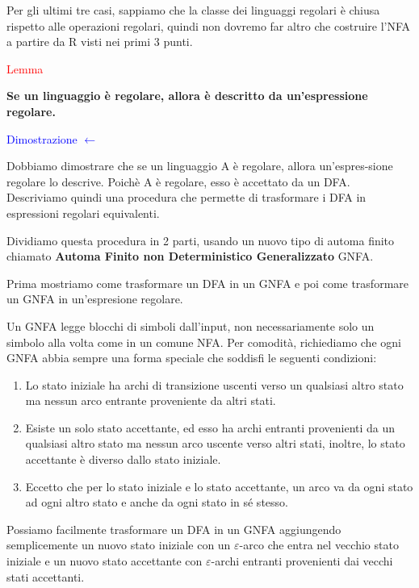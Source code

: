 \documentclass{article}
\begin{document}
    Per gli ultimi tre casi, sappiamo che la classe dei linguaggi regolari è chiusa rispetto alle operazioni regolari, quindi non dovremo far altro che costruire l'NFA a partire da R visti nei primi 3 punti.

\begin{center}
    \textcolor{red}{Lemma}

    \textbf{Se un linguaggio è regolare, allora è descritto da un'espressione regolare.}
\end{center}

\textcolor{blue}{Dimostrazione $\leftarrow$}

Dobbiamo dimostrare che se un linguaggio A è regolare, allora un'espres-sione regolare lo descrive. Poichè A è regolare, esso è accettato da un DFA. Descriviamo quindi una procedura che permette di trasformare i DFA in espressioni regolari equivalenti.

Dividiamo questa procedura in 2 parti, usando un nuovo tipo di automa finito chiamato \textbf{Automa Finito non Deterministico Generalizzato} GNFA.

Prima mostriamo come trasformare un DFA in un GNFA e poi come trasformare un GNFA in un'espresione regolare. 

Un GNFA legge blocchi di simboli dall'input, non necessariamente solo un simbolo alla volta come in un comune NFA. Per comodità, richiediamo che ogni GNFA abbia sempre una forma speciale che soddisfi le seguenti condizioni:

\begin{enumerate}
    \item Lo stato iniziale ha archi di transizione uscenti verso un qualsiasi altro stato ma nessun arco entrante proveniente da altri stati.
    \item Esiste un solo stato accettante, ed esso ha archi entranti provenienti da un qualsiasi altro stato ma nessun arco uscente verso altri stati, inoltre, lo stato accettante è diverso dallo stato iniziale.
    \item Eccetto che per lo stato iniziale e lo stato accettante, un arco va da ogni stato ad ogni altro stato e anche da ogni stato in sé stesso.
\end{enumerate}

Possiamo facilmente trasformare un DFA in un GNFA aggiungendo semplicemente un nuovo stato iniziale con un $\varepsilon$-arco che entra nel vecchio stato iniziale e un nuovo stato accettante con $\varepsilon$-archi entranti provenienti dai vecchi stati accettanti.
\end{document}
